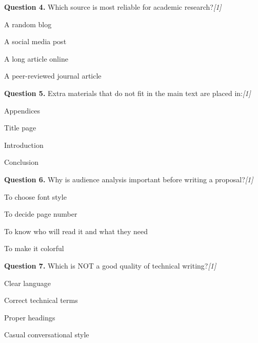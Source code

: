 \documentclass[11pt,a4paper]{article}
\newcommand{\pts}[1]{\hfill   \textit{[#1]}}
\begin{document}
\medskip




\noindent   \textbf{Question 4.} Which source is most reliable for academic research?\pts{1}

\begin{parts}
  \item A random blog
  \item A social media post
  \item A long article online
  \item A peer-reviewed journal article
\end{parts}

\medskip




\noindent   \textbf{Question 5.} Extra materials that do not fit in the main text are placed in:\pts{1}

\begin{parts}
  \item Appendices
  \item Title page
  \item Introduction
  \item Conclusion
\end{parts}

\medskip




\noindent   \textbf{Question 6.} Why is audience analysis important before writing a proposal?\pts{1}

\begin{parts}
  \item To choose font style
  \item To decide page number
  \item To know who will read it and what they need
  \item To make it colorful
\end{parts}

\medskip




\noindent   \textbf{Question 7.} Which is NOT a good quality of technical writing?\pts{1}

\begin{parts}
  \item Clear language
  \item Correct technical terms
  \item Proper headings
  \item Casual conversational style
\end{parts}
\end{document}
